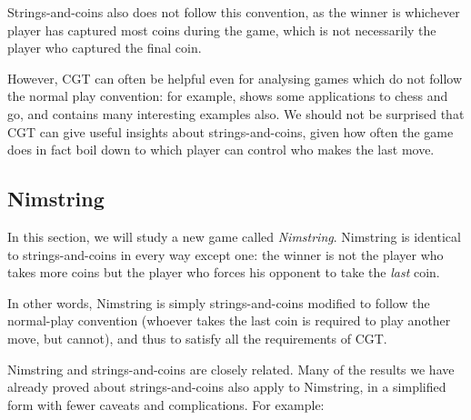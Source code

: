 \documentclass[a4paper,twocolumn]{article}
\begin{document}
Strings-and-coins also does not follow this convention, as the winner
is whichever player has captured most coins during the game, which is
not necessarily the player who captured the final coin.

However, CGT can often be helpful even for analysing games which do
not follow the normal play convention: for example, \cite{nochance}
shows some applications to chess and go, and \cite{wways} contains
many interesting examples also. We should not be surprised that CGT
can give useful insights about strings-and-coins, given how often the
game does in fact boil down to which player can control who makes the
last move.

\subsection{Nimstring}

In this section, we will study a new game called
\emph{Nimstring}. Nimstring is identical to strings-and-coins in every
way except one: the winner is not the player who takes more coins but
the player who forces his opponent to take the \emph{last}
coin.

In other words, Nimstring is simply strings-and-coins modified to
follow the normal-play convention (whoever takes the last coin is required
to play another move, but cannot), and thus to satisfy all the requirements
of CGT.

Nimstring and strings-and-coins are closely related. Many of the results
we have already proved about strings-and-coins also apply to Nimstring,
in a simplified form with fewer caveats and complications. For example:
\end{document}
